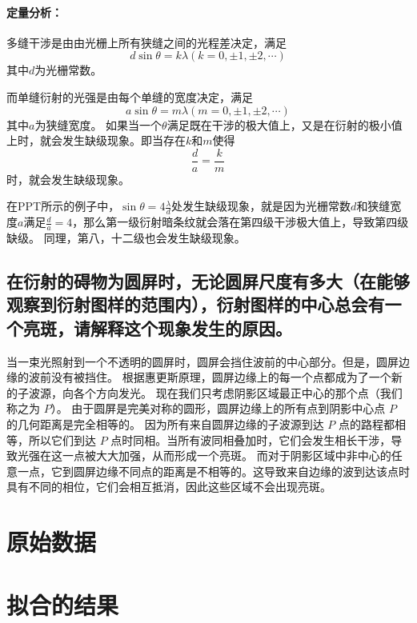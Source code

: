 \documentclass[]{../template/Report}%
\begin{document}
\begin{fullreportonly}
\paragraph{定量分析：}
多缝干涉是由由光栅上所有狭缝之间的光程差决定，满足\[
d\sin\theta = k\lambda (k = 0, \pm 1, \pm 2, \cdots)
\]
其中$d$为光栅常数。

而单缝衍射的光强是由每个单缝的宽度决定，满足\[
a\sin\theta = m\lambda (m = 0, \pm 1, \pm 2, \cdots)
\]
其中$a$为狭缝宽度。
如果当一个$\theta$满足既在干涉的极大值上，又是在衍射的极小值上时，就会发生缺级现象。即当存在$k$和$m$使得
\[
\frac{d}{a} = \frac{k}{m}
\]
时，就会发生缺级现象。

在PPT所示的例子中，$\sin\theta = 4\frac{\lambda}{d}$处发生缺级现象，就是因为光栅常数$d$和狭缝宽度$a$满足$\frac{d}{a} = 4$，那么第一级衍射暗条纹就会落在第四级干涉极大值上，导致第四级缺级。
同理，第八，十二级也会发生缺级现象。
\subsection{在衍射的碍物为圆屏时，无论圆屏尺度有多大（在能够观察到衍射图样的范围内），衍射图样的中心总会有一个亮斑，请解释这个现象发生的原因。}
当一束光照射到一个不透明的圆屏时，圆屏会挡住波前的中心部分。但是，圆屏边缘的波前没有被挡住。
根据惠更斯原理，圆屏边缘上的每一个点都成为了一个新的子波源，向各个方向发光。
现在我们只考虑阴影区域最正中心的那个点（我们称之为 $P$）。
由于圆屏是完美对称的圆形，圆屏边缘上的所有点到阴影中心点 $P$ 的几何距离是完全相等的。
因为所有来自圆屏边缘的子波源到达 $P$ 点的路程都相等，所以它们到达 $P$ 点时同相。当所有波同相叠加时，它们会发生相长干涉，导致光强在这一点被大大加强，从而形成一个亮斑。
而对于阴影区域中非中心的任意一点，它到圆屏边缘不同点的距离是不相等的。这导致来自边缘的波到达该点时具有不同的相位，它们会相互抵消，因此这些区域不会出现亮斑。
\end{fullreportonly}
\insertnotes
\begin{fullreportonly}
    \clearpage
\appendix
\section{原始数据}\label{data}
\section{拟合的结果}\label{res}

\end{fullreportonly}
\end{document}
